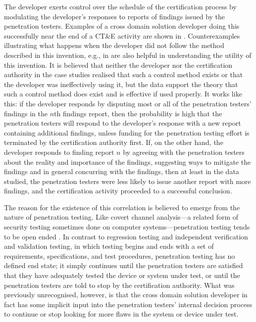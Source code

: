 \documentclass[12pt,letterpaper]{article}
\begin{document}
The developer exerts control over the schedule of the certification process by modulating the
developer's responses to reports of findings
issued by the penetration testers.  Examples of a cross domain solution developer doing
this successfully near the end of a CT\&E activity are shown in \cite[chapter 5]{Loughry2012b}.
Counterexamples illustrating what happens when the developer did not follow the method described
in this invention, e.g., in \cite[chapter 4]{Loughry2012b} are also helpful in understanding
the utility of this invention.  It is believed that neither the developer nor the certification
authority in the case studies realised that such a control method exists or that the developer was
ineffectively using it, but the data support the theory that such a control method does exist
and is effective if used properly.  It works like this: if the developer responds by disputing
most or all of the penetration testers' findings in the $n$th findings report, then the probability
is high that the penetration testers will respond to the developer's response with a new report
containing additional findings, 
unless funding for the penetration testing effort is terminated by the
certification authority first.  If, on the other hand, the developer responds to finding
report $n$ by agreeing with the penetration testers about the reality and importance of the
findings, suggesting ways to mitigate the findings and in general concurring with the findings,
then at least in the data studied, the penetration testers were less likely to issue another
report with more findings, and the certification activity proceeded to a successful conclusion.

The reason for the existence of this correlation is believed to emerge from the nature of
penetration testing.  Like covert channel analysis---a related form of security testing
sometimes done on computer systems---penetration testing tends to be open ended
\cite{NCSC-TG-030,Pulugurtha2008}.  In contrast to regression testing and
independent verification and validation testing, in which testing begins and ends with a set of
requirements, specifications, and test procedures, penetration testing has no defined end
state; it simply continues until the penetration testers are satisfied that they have adequately
tested the device or system under test, or until the penetration testers are
told to stop by the certification authority.  What was previously unrecognised, however, is
that the cross domain solution developer in fact has some implicit input into the penetration
testers' internal decision process to continue or stop looking for more flaws in the system
or device under test.
\end{document}
